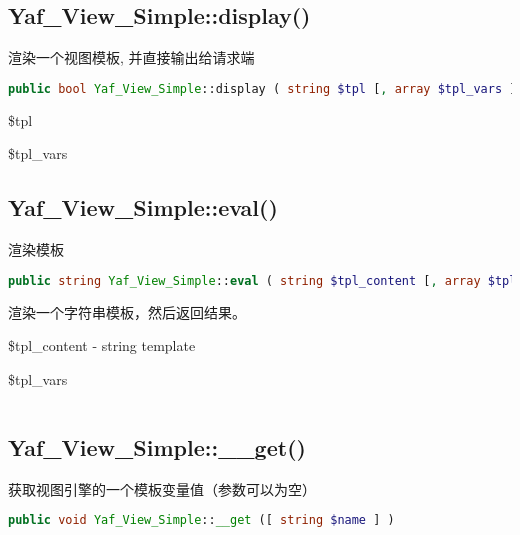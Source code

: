 \subsection{Yaf\_View\_Simple::display()}


渲染一个视图模板, 并直接输出给请求端

\begin{lstlisting}[language=PHP]
public bool Yaf_View_Simple::display ( string $tpl [, array $tpl_vars ] )
\end{lstlisting}

\begin{compactitem}
\item \$tpl
\item \$tpl\_vars
\end{compactitem}



\subsection{Yaf\_View\_Simple::eval()}

渲染模板

\begin{lstlisting}[language=PHP]
public string Yaf_View_Simple::eval ( string $tpl_content [, array $tpl_vars ] )
\end{lstlisting}

渲染一个字符串模板，然后返回结果。

\begin{compactitem}
\item \$tpl\_content - string template
\item \$tpl\_vars
\end{compactitem}



\begin{lstlisting}[language=PHP]

\end{lstlisting}

\subsection{Yaf\_View\_Simple::\_\_get()}

获取视图引擎的一个模板变量值（参数可以为空）

\begin{lstlisting}[language=PHP]
public void Yaf_View_Simple::__get ([ string $name ] )
\end{lstlisting}


